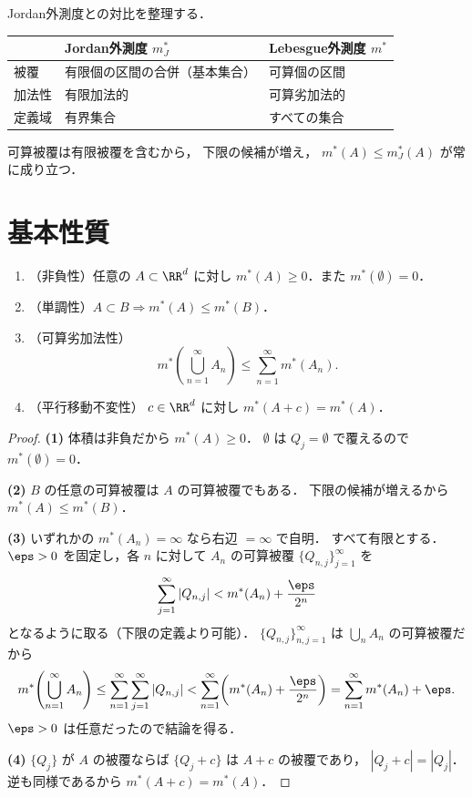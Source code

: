 \begin{remark}\label{rem:jordan-vs-lebesgue-outer}
Jordan外測度との対比を整理する．
\begin{center}
\begin{tabular}{l|l|l}
 & Jordan外測度 $m_J^*$ & Lebesgue外測度 $m^*$ \\
\hline
被覆 & 有限個の区間の合併（基本集合） & 可算個の区間 \\
加法性 & 有限加法的 & 可算劣加法的 \\
定義域 & 有界集合 & すべての集合
\end{tabular}
\end{center}
可算被覆は有限被覆を含むから，
下限の候補が増え，
$m^*(A) \le m_J^*(A)$ が常に成り立つ．
\end{remark}

\section{基本性質}\label{sec:lebesgue-outer-prop}

\begin{theorem}[Lebesgue外測度の基本性質]\label{thm:lebesgue-outer-properties}
\begin{enumerate}
\item （非負性）任意の $A \subset \RR^d$ に対し
$m^*(A) \ge 0$．また $m^*(\emptyset) = 0$．
\item （単調性）$A \subset B \Rightarrow m^*(A) \le m^*(B)$．
\item （可算劣加法性）
\[
m^*\!\left(\bigcup_{n=1}^{\infty} A_n\right)
\le \sum_{n=1}^{\infty} m^*(A_n).
\]
\item （平行移動不変性）
$c \in \RR^d$ に対し $m^*(A+c) = m^*(A)$．
\end{enumerate}
\end{theorem}
\begin{proof}
\textbf{(1)}\quad
体積は非負だから $m^*(A) \ge 0$．
$\emptyset$ は $Q_j = \emptyset$ で覆えるので $m^*(\emptyset) = 0$．

\textbf{(2)}\quad
$B$ の任意の可算被覆は $A$ の可算被覆でもある．
下限の候補が増えるから $m^*(A) \le m^*(B)$．

\textbf{(3)}\quad
いずれかの $m^*(A_n) = \infty$ なら右辺 $= \infty$ で自明．
すべて有限とする．
$\eps > 0$ を固定し，各 $n$ に対して
$A_n$ の可算被覆 $\{Q_{n,j}\}_{j=1}^{\infty}$ を
\[
\sum_{j=1}^{\infty} |Q_{n,j}| < m^*(A_n) + \frac{\eps}{2^n}
\]
となるように取る（下限の定義より可能）．
$\{Q_{n,j}\}_{n,j=1}^{\infty}$ は
$\bigcup_n A_n$ の可算被覆だから
\[
m^*\!\left(\bigcup_{n=1}^{\infty} A_n\right)
\le
\sum_{n=1}^{\infty}\sum_{j=1}^{\infty} |Q_{n,j}|
<
\sum_{n=1}^{\infty}\!\left(m^*(A_n) + \frac{\eps}{2^n}\right)
=
\sum_{n=1}^{\infty} m^*(A_n) + \eps.
\]
$\eps > 0$ は任意だったので結論を得る．

\textbf{(4)}\quad
$\{Q_j\}$ が $A$ の被覆ならば $\{Q_j + c\}$ は $A+c$ の被覆であり，
$|Q_j + c| = |Q_j|$．逆も同様であるから $m^*(A+c) = m^*(A)$．
\end{proof}

